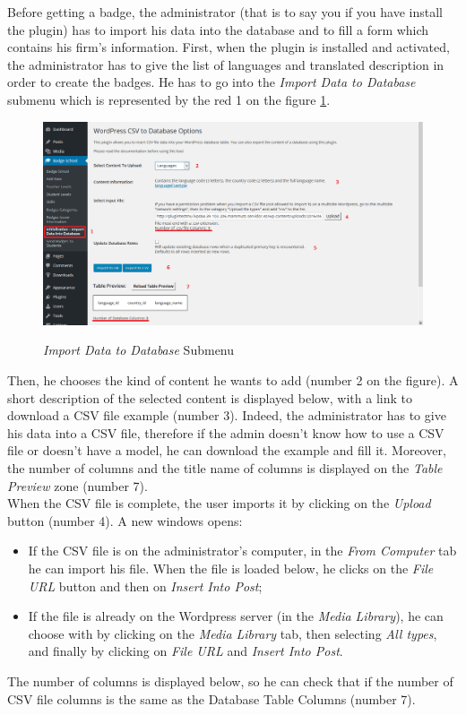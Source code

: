 \documentclass[a4paper, 12pt]{report}
\begin{document}
	Before getting a badge, the administrator (that is to say you if you have install the plugin) has to import his data into the database and to fill a form which contains his firm's information. First, when the plugin is installed and activated, the administrator has to give the list of languages and translated description in order to create the badges. He has to go into the \textit{Import Data to Database} submenu which is represented by the red 1 on the figure \ref{importDataIntoDB}.
	
	\begin{figure}[h]
		\caption{\textit{Import Data to Database} Submenu}
		\includegraphics[scale=0.45]{includes/importDataIntoDB}
		\label{importDataIntoDB}
	\end{figure}
	
	
	Then, he chooses the kind of content he wants to add (number 2 on the figure). A short description of the selected content is displayed below, with a link to download a CSV file example (number 3). Indeed, the administrator has to give his data into a CSV file, therefore if the admin doesn't know how to use a CSV file or doesn't have a model, he can download the example and fill it. Moreover, the number of columns and the title name of columns is displayed on the \textit{Table Preview} zone (number 7).\\ 
	
	When the CSV file is complete, the user imports it by clicking on the \textit{Upload} button (number 4). A new windows opens:
	\begin{itemize}
		\item If the CSV file is on the administrator's computer, in the \textit{From Computer} tab he can import his file. When the file is loaded below, he clicks on the \textit{File URL} button and then on \textit{Insert Into Post};
		\item If the file is already on the Wordpress server (in the \textit{Media Library}), he can choose with by clicking on the \textit{Media Library} tab, then selecting \textit{All types}, and finally by clicking on \textit{File URL} and \textit{Insert Into Post}.
	\end{itemize}
	The number of columns is displayed below, so he can check that if the number of CSV file columns is the same as the Database Table Columns (number 7).\\
	
\end{document}
